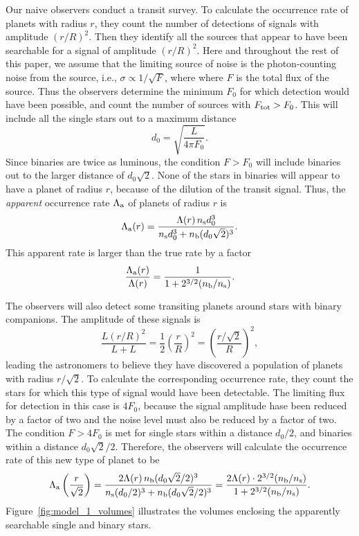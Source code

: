\documentclass[12pt,modern]{aastex61}
\renewcommand{\a}{_{\rm a}}
\newcommand{\s}{_{\rm s}}
\renewcommand{\b}{_{\rm b}}
\begin{document}
Our naive observers conduct a transit survey. To calculate the
occurrence rate of planets with radius $r$, they count the number of
detections of signals with amplitude $(r/R)^2$.  Then they identify
all the sources that appear to have been searchable for a signal of
amplitude $(r/R)^2$.  Here and throughout the rest of this paper, we
assume that the limiting source of noise is the photon-counting noise
from the source, i.e., $\sigma \propto 1/\sqrt{F}$, where
where $F$ is the total flux of the source.
Thus the observers determine the minimum $F_0$ for which detection would have been
possible, and count the number of sources with $F_{\rm tot}>F_0$. This will
include all the single stars out to a maximum distance
\begin{equation}
  d_0 = \sqrt{\frac{L}{4\pi F_0}}.
  \label{eq:dmax}
\end{equation}
Since binaries are twice as luminous, the condition $F>F_0$ will
include binaries out to the larger distance of $d_0\sqrt{2}$.
None of the stars in binaries will
appear to have a planet of radius $r$, because of the dilution of
the transit signal.  Thus, the {\it apparent} occurrence rate $\Lambda\a$ of
planets of radius $r$ is
\begin{equation}
    \Lambda\a(r) = 
        \frac{\Lambda(r) \, n\s d_0^3}
        {n\s d_0^3 + n\b (d_0\sqrt{2})^3}.
    \label{eq:rate_at_rp}
\end{equation}
This apparent rate is larger than the true rate by a factor
\begin{equation}
    \frac{\Lambda\a(r)}{\Lambda(r)} = 
        \frac{1}{1 + 2^{3/2}(n\b/n\s)}.
    \label{eq:correction_rp}
\end{equation}

The observers will also detect some transiting planets around stars
with binary companions.  The amplitude of these signals is
\begin{equation}
  \frac{L(r/R)^2}{L + L} = \frac{1}{2}\left(\frac{r}{R}\right)^2 =
  \left(\frac{r/\sqrt{2}}{R}\right)^2,
    \label{eq:delta_obs_general} 
\end{equation}
leading the astronomers to believe they have discovered a population
of planets with radius $r/\sqrt{2}$.  To calculate the corresponding
occurrence rate, they count the stars for which this type of signal
would have been detectable.  The limiting flux for detection in this
case is $4F_0$, because the signal amplitude hase been reduced by a
factor of two and the noise level must also be reduced by a factor of
two.  The condition $F>4F_0$ is met for single stars within a distance
$d_0/2$, and binaries within a distance $d_0\sqrt{2}/2$.  Therefore,
the observers will calculate the occurrence rate of this new type of
planet to be
\begin{equation}
    \Lambda\a\left( \frac{r}{\sqrt{2}} \right) = 
        \frac{2\Lambda(r) \, n\b (d_0\sqrt{2}/2)^3}
        {n\s (d_0/2)^3 + n\b (d_0\sqrt{2}/2)^3}
    =
    \frac{2\Lambda(r)\cdot2^{3/2}(n\b/n\s)}{1 + 2^{3/2} (n\b/n\s)}.
    \label{eq:correction_diluted_rp}
\end{equation}
Figure~\ref{fig:model_1_volumes} illustrates the
volumes enclosing the apparently searchable single and binary stars.
\end{document}
